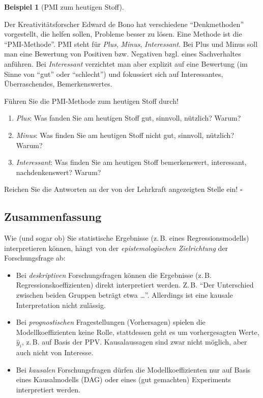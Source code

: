 \documentclass[
  ngerman,
  letterpaper,
  twoside,
  open=any]{scrbook}
\providecommand{\tightlist}{%
  \setlength{\itemsep}{0pt}\setlength{\parskip}{0pt}}\usepackage{longtable,booktabs,array}
\theoremstyle{definition}
\newtheorem{example}{Beispiel}[chapter]
\theoremstyle{plain}
\theoremstyle{definition}
\theoremstyle{definition}
\theoremstyle{definition}
\newtheorem{example}{Beispiel}[chapter]
\theoremstyle{definition}
\theoremstyle{remark}
\begin{document}
\begin{example}[PMI zum heutigen
Stoff]\protect\hypertarget{exm-pmi-kausal1}{}\label{exm-pmi-kausal1}

Der Kreativitätsforscher Edward de Bono hat verschiedene
\enquote{Denkmethoden} vorgestellt, die helfen sollen, Probleme besser
zu lösen. Eine Methode ist die \enquote{PMI-Methode}. PMI steht für
\emph{Plus}, \emph{Minus}, \emph{Interessant}. Bei Plus und Minus soll
man eine Bewertung von Positiven bzw. Negativen bzgl. eines
Sachverhaltes anführen. Bei \emph{Interessant} verzichtet man aber
explizit auf eine Bewertung (im Sinne von \enquote{gut} oder
\enquote{schlecht}) und fokussiert sich auf Interessantes,
Überraschendes, Bemerkenswertes.

Führen Sie die PMI-Methode zum heutigen Stoff durch!

\begin{enumerate}
\def\labelenumi{\arabic{enumi}.}
\tightlist
\item
  \emph{Plus}: Was fanden Sie am heutigen Stoff gut, sinnvoll, nützlich?
  Warum?
\item
  \emph{Minus}: Was finden Sie am heutigen Stoff nicht gut, sinnvoll,
  nützlich? Warum?
\item
  \emph{Interessant}: Was finden Sie am heutigen Stoff bemerkenswert,
  interessant, nachdenkenswert? Warum?
\end{enumerate}

Reichen Sie die Antworten an der von der Lehrkraft angezeigten Stelle
ein! \(\square\)

\end{example}

\subsection{Zusammenfassung}\label{zusammenfassung-3}

Wie (und sogar ob) Sie statistische Ergebnisse (z.\,B. eines
Regressionsmodells) interpretieren können, hängt von der
\emph{epistemologischen Zielrichtung} der Forschungsfrage ab:

\begin{itemize}
\tightlist
\item
  Bei \emph{deskriptiven} Forschungsfragen können die Ergebnisse (z.\,B.
  Regressionskoeffizienten) direkt interpretiert werden. Z.\,B.
  \enquote{Der Unterschied zwischen beiden Gruppen beträgt etwa
  \ldots{}}. Allerdings ist eine kausale Interpretation nicht zulässig.
\item
  Bei \emph{prognostischen} Fragestellungen (Vorhersagen) spielen die
  Modellkoeffizienten keine Rolle, stattdessen geht es um vorhergesagten
  Werte, \(\hat{y}_i\), z.\,B. auf Basis der PPV. Kausalaussagen sind
  zwar nicht möglich, aber auch nicht von Interesse.
\item
  Bei \emph{kausalen} Forschungsfragen dürfen die Modellkoeffizienten
  nur auf Basis eines Kausalmodells (DAG) oder eines (gut gemachten)
  Experiments interpretiert werden.
\end{itemize}
\end{document}
